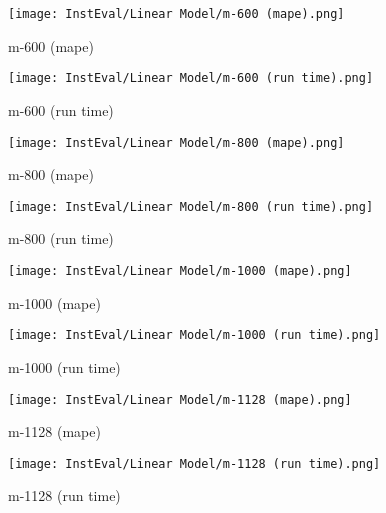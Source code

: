 \documentclass[12pt]{article}
\begin{document}
\begin{figure}[H]
\centering
    \begin{minipage}{0.45\textwidth}
        \centering
        \texttt{[image: InstEval/Linear Model/m-600 (mape).png]}
        \caption{m-600 (mape)}
        
    \end{minipage}\hfill
    \begin{minipage}{0.45\textwidth}
        \centering
        \texttt{[image: InstEval/Linear Model/m-600 (run time).png]}
        \caption{m-600 (run time)}
    \end{minipage}
\end{figure}

\begin{figure}[H]
\centering
    \begin{minipage}{0.45\textwidth}
        \centering
        \texttt{[image: InstEval/Linear Model/m-800 (mape).png]}
        \caption{m-800 (mape)}
        
    \end{minipage}\hfill
    \begin{minipage}{0.45\textwidth}
        \centering
        \texttt{[image: InstEval/Linear Model/m-800 (run time).png]}
        \caption{m-800 (run time)}
    \end{minipage}
\end{figure}

\begin{figure}[H]
\centering
    \begin{minipage}{0.45\textwidth}
        \centering
        \texttt{[image: InstEval/Linear Model/m-1000 (mape).png]}
        \caption{m-1000 (mape)}
        
    \end{minipage}\hfill
    \begin{minipage}{0.45\textwidth}
        \centering
        \texttt{[image: InstEval/Linear Model/m-1000 (run time).png]}
        \caption{m-1000 (run time)}
    \end{minipage}
\end{figure}

\begin{figure}[H]
\centering
    \begin{minipage}{0.45\textwidth}
        \centering
        \texttt{[image: InstEval/Linear Model/m-1128 (mape).png]}
        \caption{m-1128 (mape)}
        
    \end{minipage}\hfill
    \begin{minipage}{0.45\textwidth}
        \centering
        \texttt{[image: InstEval/Linear Model/m-1128 (run time).png]}
        \caption{m-1128 (run time)}
    \end{minipage}
\end{figure}
\end{document}
